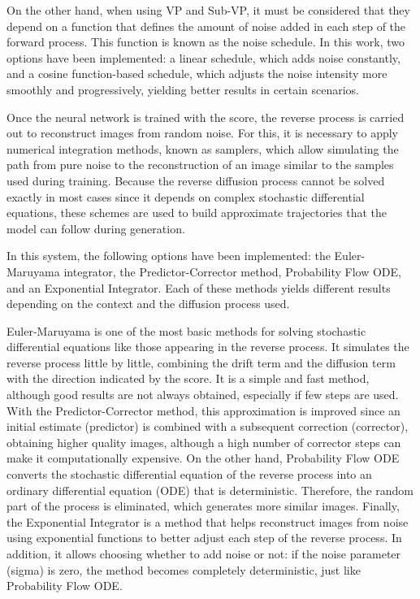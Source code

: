 \documentclass[11pt,a4paper]{article}
\begin{document}
On the other hand, when using VP and Sub-VP, it must be considered that they depend on a function that defines the amount of noise added in each step of the forward process. This function is known as the noise schedule. In this work, two options have been implemented: a linear schedule, which adds noise constantly, and a cosine function-based schedule, which adjusts the noise intensity more smoothly and progressively, yielding better results in certain scenarios.

Once the neural network is trained with the score, the reverse process is carried out to reconstruct images from random noise. For this, it is necessary to apply numerical integration methods, known as samplers, which allow simulating the path from pure noise to the reconstruction of an image similar to the samples used during training. Because the reverse diffusion process cannot be solved exactly in most cases since it depends on complex stochastic differential equations, these schemes are used to build approximate trajectories that the model can follow during generation.

In this system, the following options have been implemented: the Euler-Maruyama integrator, the Predictor-Corrector method, Probability Flow ODE, and an Exponential Integrator. Each of these methods yields different results depending on the context and the diffusion process used.

Euler-Maruyama is one of the most basic methods for solving stochastic differential equations like those appearing in the reverse process. It simulates the reverse process little by little, combining the drift term and the diffusion term with the direction indicated by the score. It is a simple and fast method, although good results are not always obtained, especially if few steps are used. With the Predictor-Corrector method, this approximation is improved since an initial estimate (predictor) is combined with a subsequent correction (corrector), obtaining higher quality images, although a high number of corrector steps can make it computationally expensive. On the other hand, Probability Flow ODE converts the stochastic differential equation of the reverse process into an ordinary differential equation (ODE) that is deterministic. Therefore, the random part of the process is eliminated, which generates more similar images. Finally, the Exponential Integrator is a method that helps reconstruct images from noise using exponential functions to better adjust each step of the reverse process. In addition, it allows choosing whether to add noise or not: if the noise parameter (sigma) is zero, the method becomes completely deterministic, just like Probability Flow ODE.
\end{document}
